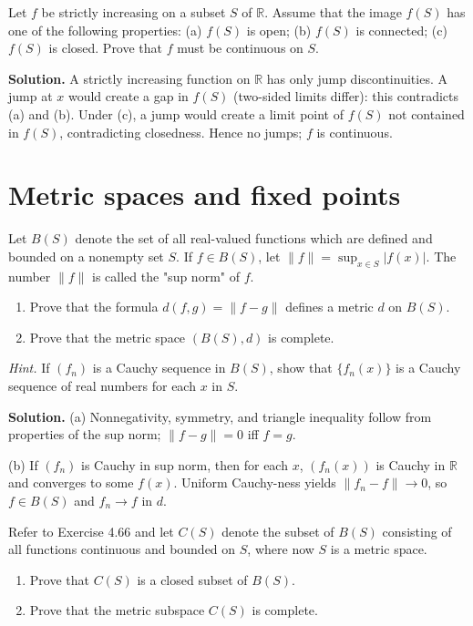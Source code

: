 \begin{problembox}
Let $f$ be strictly increasing on a subset $S$ of $\mathbb{R}$. Assume that the image $f(S)$ has one of the following properties: 
(a) $f(S)$ is open; (b) $f(S)$ is connected; (c) $f(S)$ is closed. Prove that $f$ must be continuous on $S$.
\end{problembox}

\noindent\textbf{Solution.}
A strictly increasing function on $\mathbb{R}$ has only jump discontinuities. A jump at $x$ would create a gap in $f(S)$ (two-sided limits differ): this contradicts (a) and (b). Under (c), a jump would create a limit point of $f(S)$ not contained in $f(S)$, contradicting closedness. Hence no jumps; $f$ is continuous.
\medskip

\section{Metric spaces and fixed points}

\begin{problembox}
Let $B(S)$ denote the set of all real-valued functions which are defined and bounded on a nonempty set $S$. If $f \in B(S)$, let $\|f\| = \sup_{x \in S} |f(x)|$. The number $\|f\|$ is called the "sup norm" of $f$.
\begin{enumerate}[label=(\alph*)]
\item Prove that the formula $d(f, g) = \|f - g\|$ defines a metric $d$ on $B(S)$.
\item Prove that the metric space $(B(S), d)$ is complete. 
\end{enumerate}
\textit{Hint.} If $(f_n)$ is a Cauchy sequence in $B(S)$, show that $\{f_n(x)\}$ is a Cauchy sequence of real numbers for each $x$ in $S$.
\end{problembox}

\noindent\textbf{Solution.}
(a) Nonnegativity, symmetry, and triangle inequality follow from properties of the sup norm; $\|f-g\|=0$ iff $f=g$.

(b) If $(f_n)$ is Cauchy in sup norm, then for each $x$, $(f_n(x))$ is Cauchy in $\mathbb{R}$ and converges to some $f(x)$. Uniform Cauchy-ness yields $\|f_n-f\|\to 0$, so $f\in B(S)$ and $f_n\to f$ in $d$.
\medskip

\begin{problembox}
Refer to Exercise 4.66 and let $C(S)$ denote the subset of $B(S)$ consisting of all functions continuous and bounded on $S$, where now $S$ is a metric space.
\begin{enumerate}[label=(\alph*)]
\item Prove that $C(S)$ is a closed subset of $B(S)$.
\item Prove that the metric subspace $C(S)$ is complete.
\end{enumerate}
\end{problembox}

